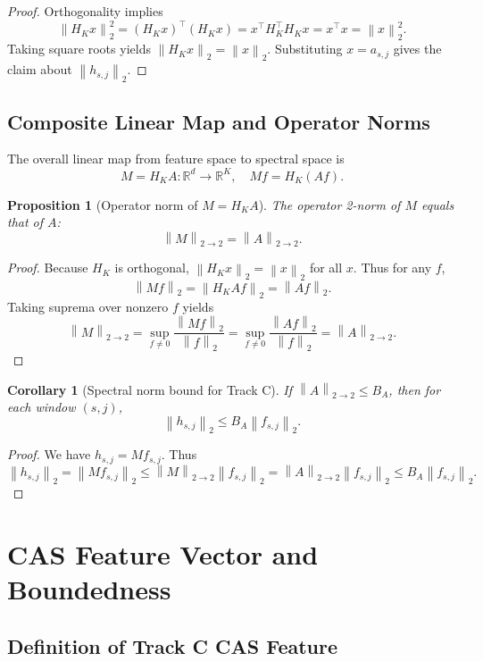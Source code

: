 \documentclass[11pt]{article}
\newtheorem{proposition}[definition]{Proposition}
\newtheorem{corollary}[definition]{Corollary}
\newcommand{\R}{\mathbb{R}}
\newcommand{\norm}[1]{\left\lVert #1 \right\rVert}
\begin{document}
\begin{proof}
Orthogonality implies
\[
  \norm{H_K x}_2^2 = (H_K x)^\top (H_K x)
  = x^\top H_K^\top H_K x
  = x^\top x = \norm{x}_2^2.
\]
Taking square roots yields \(\norm{H_K x}_2 = \norm{x}_2\).
Substituting \(x = a_{s,j}\) gives the claim about \(\norm{h_{s,j}}_2\).
\end{proof}

\subsection{Composite Linear Map and Operator Norms}

The overall linear map from feature space to spectral space is
\[
  M = H_K A : \R^d \to \R^K, \quad M f = H_K (A f).
\]

\begin{proposition}[Operator norm of \(M = H_K A\)]
The operator 2-norm of \(M\) equals that of \(A\):
\[
  \norm{M}_{2\to2} = \norm{A}_{2\to2}.
\]
\end{proposition}

\begin{proof}
Because \(H_K\) is orthogonal, \(\norm{H_K x}_2 = \norm{x}_2\) for all \(x\).
Thus for any \(f\),
\[
  \norm{M f}_2 = \norm{H_K A f}_2 = \norm{A f}_2.
\]
Taking suprema over nonzero \(f\) yields
\[
  \norm{M}_{2\to2} = \sup_{f \ne 0} \frac{\norm{M f}_2}{\norm{f}_2}
  = \sup_{f \ne 0} \frac{\norm{A f}_2}{\norm{f}_2}
  = \norm{A}_{2\to2}.
\]
\end{proof}

\begin{corollary}[Spectral norm bound for Track C]
If \(\norm{A}_{2\to2} \le B_A\), then for each window \((s,j)\),
\[
  \norm{h_{s,j}}_2 \le B_A \norm{f_{s,j}}_2.
\]
\end{corollary}

\begin{proof}
We have \(h_{s,j} = M f_{s,j}\).
Thus
\[
  \norm{h_{s,j}}_2 = \norm{M f_{s,j}}_2 \le \norm{M}_{2\to2} \norm{f_{s,j}}_2 = \norm{A}_{2\to2} \norm{f_{s,j}}_2 \le B_A \norm{f_{s,j}}_2.
\]
\end{proof}

\section{CAS Feature Vector and Boundedness}

\subsection{Definition of Track C CAS Feature}
\end{document}
